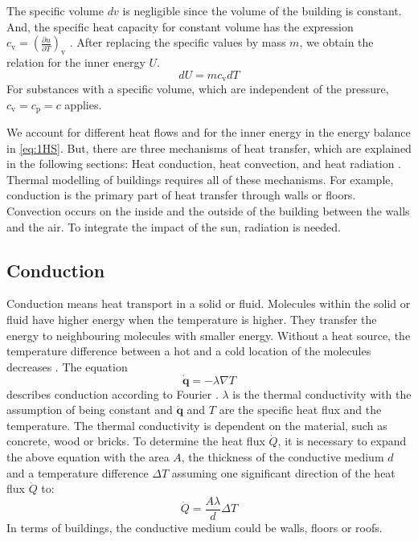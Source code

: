     The specific volume $dv$ is negligible since the volume of the building is constant. And, the specific heat capacity for constant volume has the expression $c_\text{v} = (\frac{\partial u}{\partial T})_\text{v}$ \cite{Baehr.2016b}. After replacing the specific values by mass $m$, we obtain the relation for the inner energy $U$. 
        \begin{equation}
        \label{eq:innerEnergy}
        d U = m c_\text{v} d T
    \end{equation}
    For substances with a specific volume, which are independent of the pressure, $c_\text{v}=c_\text{p}=c$ applies.\newline
    
    We account for different heat flows and for the inner energy in the energy balance in \autoref{eq:1HS}.
    But, there are three mechanisms of heat transfer, which are explained in the following sections: Heat conduction, heat convection, and heat radiation \cite{.2013}. Thermal modelling of buildings requires all of these mechanisms. For example, conduction is the primary part of heat transfer through walls or floors. Convection occurs on the inside and the outside of the building between the walls and the air. To integrate the impact of the sun, radiation is needed.

\subsection{Conduction}
\label{subsection:conduction}

    Conduction means heat transport in a solid or fluid. Molecules within the solid or fluid have higher energy when the temperature is higher. They transfer the energy to neighbouring molecules with smaller energy. Without a heat source, the temperature difference between a hot and a cold location of the molecules decreases \cite{Kuchling.2007}.
    \newline The equation
    \begin{equation}
    \label{eq:fourier}
        \dot{\textbf{q}} = - \lambda \nabla T
    \end{equation}
    describes conduction according to Fourier \cite{.2013}. $\lambda$ is  the thermal conductivity with the assumption of being constant and $\dot{\textbf{q}}$ and $T$ are the specific heat flux and the temperature. The thermal conductivity is dependent on the material, such as concrete, wood or bricks. 
    \newline
    To determine the heat flux $\dot{Q}$, it is necessary to expand the above equation with the area $A$, the thickness of the conductive medium $d$ and a temperature difference $\Delta T$  assuming one significant direction of the heat flux $\dot{Q}$ to:
    \begin{equation}
    \label{eq:conduction1}
        \dot{Q} = \frac{A\lambda}{d} \Delta T
    \end{equation}
    In terms of buildings, the conductive medium could be walls, floors or roofs.

